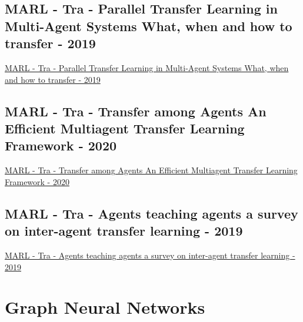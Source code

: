 \subsection{MARL - Tra - Parallel Transfer Learning in Multi-Agent Systems What, when and how to transfer - 2019}
\href{https://ieeexplore.ieee.org/abstract/document/8851784}{MARL - Tra - Parallel Transfer Learning in Multi-Agent Systems What, when and how to transfer - 2019}

\subsection{MARL - Tra - Transfer among Agents An Efficient Multiagent Transfer Learning Framework - 2020}
\href{https://arxiv.org/abs/2002.08030}{MARL - Tra - Transfer among Agents An Efficient Multiagent Transfer Learning Framework - 2020}

\subsection{MARL - Tra - Agents teaching agents a survey on inter-agent transfer learning - 2019}
\href{https://link.springer.com/article/10.1007/s10458-019-09430-0}{MARL - Tra - Agents teaching agents a survey on inter-agent transfer learning - 2019}

\section{Graph Neural Networks}
